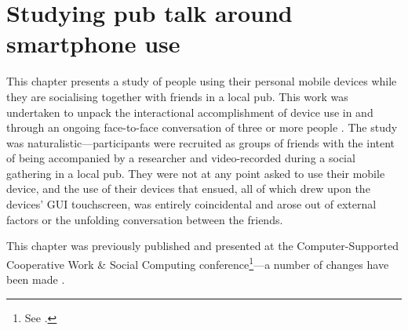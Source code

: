 


\chapter{Studying pub talk around smartphone use}\label{ch:empirical pub}



This chapter presents a study of people using their personal mobile devices while they are socialising together with friends in a local pub.
This work was undertaken to unpack the interactional accomplishment of device use in and through an ongoing face-to-face conversation of three or more people .
The study was naturalistic---participants were recruited as groups of friends with the intent of being accompanied by a researcher and video-recorded during a social gathering in a local pub.
They were not at any point asked to use their mobile device, and the use of their devices that ensued, all of which drew upon the devices' \acf{GUI} touchscreen, was entirely coincidental and arose out of external factors or the unfolding conversation between the friends.

This chapter was previously published and presented at the Comp\-uter-Supported Cooperative Work \& Social Computing conference\footnote{See \citet{Porcheron2016a}.}---a number of changes have been made .







